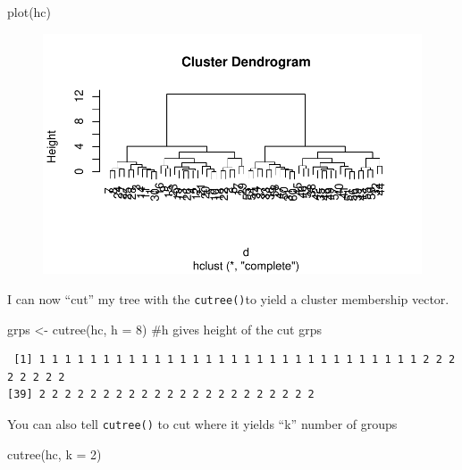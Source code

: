 \documentclass[
  letterpaper,
  DIV=11,
  numbers=noendperiod]{scrartcl}
\newenvironment{Shaded}{\begin{snugshade}}{\end{snugshade}}
\newcommand{\AttributeTok}[1]{\textcolor[rgb]{0.40,0.45,0.13}{#1}}
\newcommand{\CommentTok}[1]{\textcolor[rgb]{0.37,0.37,0.37}{#1}}
\newcommand{\DecValTok}[1]{\textcolor[rgb]{0.68,0.00,0.00}{#1}}
\newcommand{\FunctionTok}[1]{\textcolor[rgb]{0.28,0.35,0.67}{#1}}
\newcommand{\NormalTok}[1]{\textcolor[rgb]{0.00,0.23,0.31}{#1}}
\newcommand{\OtherTok}[1]{\textcolor[rgb]{0.00,0.23,0.31}{#1}}
\begin{document}
\begin{Shaded}
\begin{Highlighting}[]
\FunctionTok{plot}\NormalTok{(hc)}
\end{Highlighting}
\end{Shaded}

\begin{figure}[H]

{\centering \includegraphics{Class07_files/figure-pdf/unnamed-chunk-9-1.pdf}

}

\end{figure}

I can now ``cut'' my tree with the \texttt{cutree()}to yield a cluster
membership vector.

\begin{Shaded}
\begin{Highlighting}[]
\NormalTok{grps }\OtherTok{\textless{}{-}} \FunctionTok{cutree}\NormalTok{(hc, }\AttributeTok{h =} \DecValTok{8}\NormalTok{) }\CommentTok{\#h gives height of the cut }
\NormalTok{grps}
\end{Highlighting}
\end{Shaded}

\begin{verbatim}
 [1] 1 1 1 1 1 1 1 1 1 1 1 1 1 1 1 1 1 1 1 1 1 1 1 1 1 1 1 1 1 1 2 2 2 2 2 2 2 2
[39] 2 2 2 2 2 2 2 2 2 2 2 2 2 2 2 2 2 2 2 2 2 2
\end{verbatim}

You can also tell \texttt{cutree()} to cut where it yields ``k'' number
of groups

\begin{Shaded}
\begin{Highlighting}[]
\FunctionTok{cutree}\NormalTok{(hc, }\AttributeTok{k =} \DecValTok{2}\NormalTok{)}
\end{Highlighting}
\end{Shaded}
\end{document}
